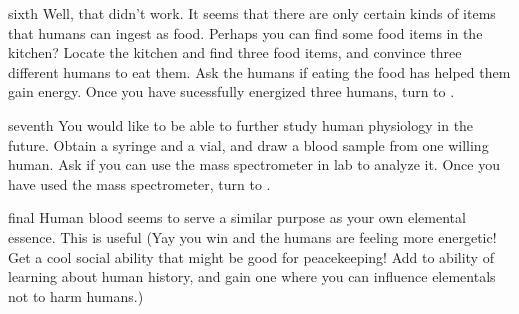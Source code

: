 \documentclass[notebook]{elementals} %
\begin{document}
\begin{page}{sixth}
 Well, that didn't work.  It seems that there are only certain kinds of items that humans can ingest as food.  Perhaps you can find some food items in the kitchen?  Locate the kitchen and find three food items, and convince three different humans to eat them.  Ask the humans if eating the food has helped them gain energy.  Once you have sucessfully energized three humans, turn to .
\end{page}

\begin{page}{seventh}
You would like to be able to further study human physiology in the future.  Obtain a syringe and a vial, and draw a blood sample from one willing human.  Ask \cGD{} if you can use the mass spectrometer in \cGD{\their} lab to analyze it.  Once you have used the mass spectrometer, turn to .
\end{page}

\begin{page}{final}
Human blood seems to serve a similar purpose as your own elemental essence.  This is useful  (Yay you win and the humans are feeling more energetic!  Get a cool social ability that might be good for peacekeeping!  Add to ability of learning about human history, and gain one where you can influence elementals not to harm humans.)
\end{page}

\endnotebook
\end{document}
